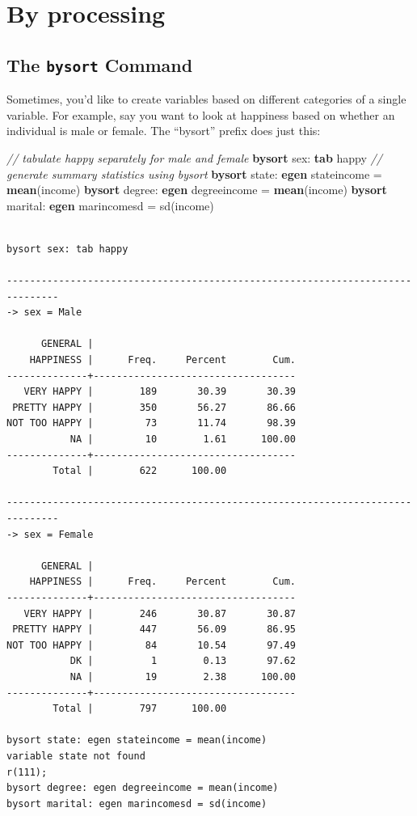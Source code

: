 \documentclass[]{book}
\newenvironment{Shaded}{\begin{snugshade}}{\end{snugshade}}
\newcommand{\CommentTok}[1]{\textcolor[rgb]{0.56,0.35,0.01}{\textit{#1}}}
\newcommand{\FunctionTok}[1]{\textcolor[rgb]{0.00,0.00,0.00}{#1}}
\newcommand{\KeywordTok}[1]{\textcolor[rgb]{0.13,0.29,0.53}{\textbf{#1}}}
\newcommand{\NormalTok}[1]{#1}
\begin{document}
\hypertarget{by-processing}{%
\section{By processing}\label{by-processing}}

\hypertarget{the-bysort-command}{%
\subsection{\texorpdfstring{The \texttt{bysort} Command}{The bysort Command}}\label{the-bysort-command}}

Sometimes, you'd like to create variables based on different categories of a single variable. For example, say you want to look at happiness based on whether an individual is male or female. The ``bysort'' prefix does just this:

\begin{Shaded}
\begin{Highlighting}[]
  \CommentTok{// tabulate happy separately for male and female }
  \KeywordTok{bysort}\NormalTok{ sex: }\KeywordTok{tab}\NormalTok{ happy}
  \CommentTok{// generate summary statistics using bysort }
  \KeywordTok{bysort}\NormalTok{ state: }\KeywordTok{egen}\NormalTok{ stateincome = }\KeywordTok{mean}\NormalTok{(income)}
  \KeywordTok{bysort}\NormalTok{ degree: }\KeywordTok{egen}\NormalTok{ degreeincome = }\KeywordTok{mean}\NormalTok{(income)}
  \KeywordTok{bysort}\NormalTok{ marital: }\KeywordTok{egen}\NormalTok{ marincomesd = }\FunctionTok{sd}\NormalTok{(income)}
\end{Highlighting}
\end{Shaded}

\begin{verbatim}

bysort sex: tab happy

-------------------------------------------------------------------------------
-> sex = Male

      GENERAL |
    HAPPINESS |      Freq.     Percent        Cum.
--------------+-----------------------------------
   VERY HAPPY |        189       30.39       30.39
 PRETTY HAPPY |        350       56.27       86.66
NOT TOO HAPPY |         73       11.74       98.39
           NA |         10        1.61      100.00
--------------+-----------------------------------
        Total |        622      100.00

-------------------------------------------------------------------------------
-> sex = Female

      GENERAL |
    HAPPINESS |      Freq.     Percent        Cum.
--------------+-----------------------------------
   VERY HAPPY |        246       30.87       30.87
 PRETTY HAPPY |        447       56.09       86.95
NOT TOO HAPPY |         84       10.54       97.49
           DK |          1        0.13       97.62
           NA |         19        2.38      100.00
--------------+-----------------------------------
        Total |        797      100.00

bysort state: egen stateincome = mean(income)
variable state not found
r(111);
bysort degree: egen degreeincome = mean(income)
bysort marital: egen marincomesd = sd(income)
\end{verbatim}
\end{document}
